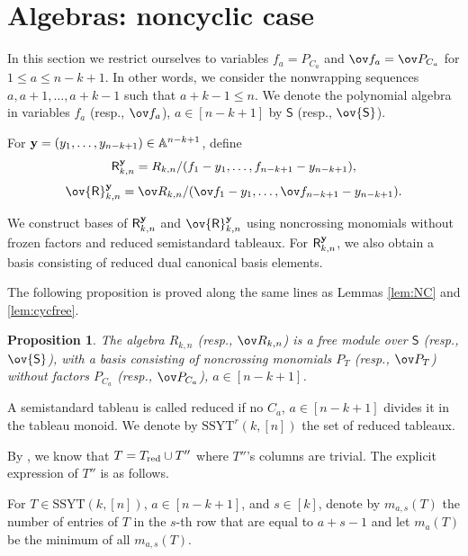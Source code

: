 \documentclass[11pt]{amsart}
\numberwithin{equation}{section}
\newtheorem{prop}[thm]{Proposition}
\newcommand{\bA}{{\mathbb A}}
\newcommand{\bfy}{{\bf y}}
\newcommand{\SSYT}{\mathrm{SSYT}}
\begin{document}
\section{Algebras: noncyclic case}\label{sec:algnoncyc}
In this section we restrict ourselves to variables 
$f_a=P_{C_a}$ and $\ov f_a = \ov P_{C_a}$ for $1\le a\le n-k+1$. 
In other words, we consider the nonwrapping sequences $a,a+1,\dots,a+k-1$ such that $a+k-1\le n$.
We denote the polynomial algebra in variables $f_a$ (resp., $\ov f_a$), $a\in [n-k+1]$ by ${\mathsf S}$ (resp., $\ov {\mathsf S}$). 

For $\bfy=(y_1,\ldots,y_{n-k+1})\in\bA^{n-k+1}$, define
\[
{\mathsf R}^\bfy_{k,n}
=R_{k,n}/(f_1-y_1,\ldots,f_{n-k+1}-y_{n-k+1}),
\]
\[
\ov{\mathsf R}^\bfy_{k,n}
=\ov R_{k,n}/(\ov f_1-y_1,\ldots,\ov f_{n-k+1}-y_{n-k+1}).
\]

We construct bases of ${\mathsf R}^\bfy_{k,n}$ and
$\ov{\mathsf R}^\bfy_{k,n}$ using noncrossing monomials
without frozen factors and reduced semistandard tableaux.
For ${\mathsf R}^\bfy_{k,n}$, we also obtain a basis
consisting of reduced dual canonical basis elements.



The following proposition is proved along the same lines as Lemmas \ref{lem:NC} and \ref{lem:cycfree}. 

\begin{prop}
The algebra $R_{k,n}$ (resp., $\ov R_{k,n}$)
is a free module over ${\mathsf S}$
(resp., $\ov{\mathsf S}$), with a basis consisting
of noncrossing monomials $P_T$ (resp., $\ov P_T$)
without factors $P_{C_a}$ (resp., $\ov P_{C_a}$),
$a\in[n-k+1]$.
\end{prop}

A semistandard tableau is called  reduced if no $C_a$, $a\in [n-k+1]$
divides it in the tableau monoid. We denote by $\SSYT^{r}(k,[n])$
the set of reduced tableaux.

By \cite{CDFL20}, we know that $T=T_{\rm red} \cup T''$ where $T''$'s columns are trivial. The explicit expression of $T''$ is as follows. 

For $T\in \SSYT(k,[n])$, $a\in [n-k+1]$, and $s\in [k]$, denote by $m_{a,s}(T)$ the number of 
entries of $T$ in the $s$-th row that are equal to $a+s-1$ and let $m_a(T)$ be the minimum 
of all $m_{a,s}(T)$.
\end{document}
